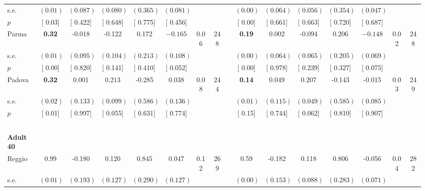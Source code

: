 \begin{longtable}{L{8em} c c c c c c c p{1em} c c c c c c c}
\quad \quad \quad \quad s.e.& $ (     0.01)$ & $ (    0.087)$ & $ (    0.080)$ & $ (    0.365)$ & $ (    0.081)$ & & & & $ (     0.00)$ & $ (    0.064)$ & $ (    0.056)$ & $ (    0.354)$ & $ (    0.047)$ & &  \\*
\quad \quad \quad \quad $ p$ & [     0.03] & [    0.422] & [    0.648] & [    0.775] & [    0.456] & & & & [     0.00] & [    0.661] & [    0.663] & [    0.720] & [    0.687] & &  \\[1em]
\quad \quad \quad Parma& \textbf{     0.32} &    -0.018 &    -0.122 &     0.172 & $ \mathbf{   -0.165}$ &      0.06 &       248 & & \textbf{     0.19} &     0.002 &    -0.094 &     0.206 & $ \mathbf{   -0.148}$ &      0.02 &       248  \\*
\quad \quad \quad \quad s.e.& $ (     0.01)$ & $ (    0.095)$ & $ (    0.104)$ & $ (    0.213)$ & $ (    0.108)$ & & & & $ (     0.00)$ & $ (    0.064)$ & $ (    0.065)$ & $ (    0.205)$ & $ (    0.069)$ & &  \\*
\quad \quad \quad \quad $ p$ & [     0.00] & [    0.820] & [    0.141] & [    0.410] & [    0.052] & & & & [     0.00] & [    0.978] & [    0.239] & [    0.327] & [    0.075] & &  \\[1em]
\quad \quad \quad Padova& \textbf{     0.32} &     0.001 & $ \mathbf{    0.213}$ &    -0.285 &     0.038 &      0.08 &       244 & & \textbf{     0.14} &     0.049 & $ \mathbf{    0.207}$ &    -0.143 &    -0.015 &      0.03 &       249  \\*
\quad \quad \quad \quad s.e.& $ (     0.02)$ & $ (    0.133)$ & $ (    0.099)$ & $ (    0.586)$ & $ (    0.136)$ & & & & $ (     0.01)$ & $ (    0.115)$ & $ (    0.049)$ & $ (    0.585)$ & $ (    0.085)$ & &  \\*
\quad \quad \quad \quad $ p$ & [     0.01] & [    0.997] & [    0.055] & [    0.631] & [    0.774] & & & & [     0.15] & [    0.744] & [    0.062] & [    0.810] & [    0.907] & &  \\[1em]
~\\[1em]
\quad \quad \textbf{Adult 40} & & & & & & & & & & & & & & & \\* 
\quad \quad \quad Reggio& 0.99 &    -0.180 &     0.120 & $ \mathbf{    0.845}$ &     0.047 &      0.12 &       269 & & 0.59 &    -0.182 &     0.118 & $ \mathbf{    0.806}$ &    -0.056 &      0.04 &       282  \\*
\quad \quad \quad \quad s.e.& $ (     0.01)$ & $ (    0.193)$ & $ (    0.127)$ & $ (    0.290)$ & $ (    0.127)$ & & & & $ (     0.00)$ & $ (    0.153)$ & $ (    0.088)$ & $ (    0.283)$ & $ (    0.071)$ & &  \\*

\end{longtable}

